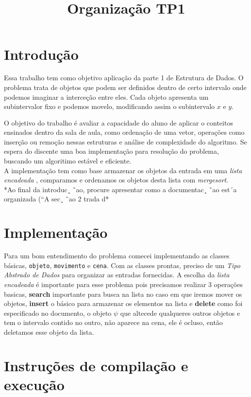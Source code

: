 \documentclass[12pt]{article}
\title{Organização TP1}
\begin{document}
 	
 	\maketitle
 	
 	\section{Introdução}
 	Essa trabalho tem como objetivo aplicação da parte 1 de Estrutura de Dados. O problema trata de objetos que podem ser definidos dentro de certo intervalo onde podemos imaginar a interceção entre eles. Cada objeto apresenta um subintervalor fixo e podemos movelo, modificando assim o subintervalo $x$ e $y$.
 	
 	O objetivo do trabalho é avaliar a capacidade do aluno de aplicar o conteitos ensinados dentro da sala de aula, como ordenação de uma vetor, operações como inserção ou remoção nessas estruturas e análise de complexidade do algoritmo. Se espera do discente uma boa implementação para resolução do problema, buscando um algoritimo estável e eficiente. \\
 	
	A implementação tem como base armazenar os objetos da entrada em uma \textit{lista encadeada} , comparamos e ordenamos  os objetos desta lista com \textit{mergesort}.\\
	
	*Ao final da introduc¸ ˜ao, procure apresentar como a documentac¸ ˜ao est´a organizada
	(“A sec¸ ˜ao 2 trada d*
 	
 	
 	\section{Implementação}
 	Para um bom entendimento do problema comecei implementando as classes básicas, \texttt{objeto}, \texttt{movimento} e \texttt{cena}. Com as classes prontas, preciso de um \textit{Tipo Abstrado de Dados} para organizar as entradas fornecidas. A escolha da \textit{lista encadeada} é importante para esse problema pois precisamos realizar 3 operações basicas, \textbf{search} importante para busca na lista no caso em que iremos mover os objetos, \textbf{insert} o básico para armazenar os elementos na lista e \textbf{delete} como foi especificado no documento, o objeto $\psi$ que altecede qualqueres outros objetos e tem o intervalo contido no outro, não aparece na cena, ele é ocluso, então deletamos esse objeto da lista.
 	
 	 
 	\section{Instruções de compilação e execução}
\end{document}

